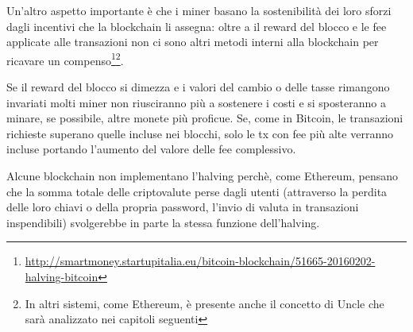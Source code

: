 Un'altro aspetto importante è che i miner basano la sostenibilità dei loro sforzi dagli incentivi che la blockchain li assegna: oltre a il reward del blocco e le fee applicate alle transazioni non ci sono altri metodi interni alla blockchain per ricavare un compenso\footnote{\url{http://smartmoney.startupitalia.eu/bitcoin-blockchain/51665-20160202-halving-bitcoin}}\footnote{In altri sistemi, come Ethereum, è presente anche il concetto di Uncle che sarà analizzato nei capitoli seguenti}.

Se il reward del blocco si dimezza e i valori del cambio o delle tasse rimangono invariati molti miner non riusciranno più a sostenere i costi e si sposteranno a minare, se possibile, altre monete più proficue. Se, come in Bitcoin, le transazioni richieste superano quelle incluse nei blocchi, solo le tx con fee più alte verranno incluse portando l'aumento del valore delle fee complessivo.

Alcune blockchain non implementano l'halving perchè, come Ethereum, pensano che la somma totale delle criptovalute perse dagli utenti (attraverso la perdita delle loro chiavi o della propria password, l'invio di valuta in transazioni inspendibili) svolgerebbe in parte la stessa funzione dell'halving.


